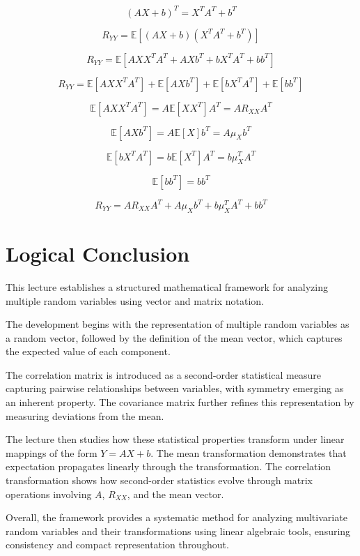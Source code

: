 \documentclass{article}
\begin{document}
\[
(A X + b)^T = X^T A^T + b^T
\]

\[
R_{YY} = \mathbb{E}[(A X + b)(X^T A^T + b^T)]
\]

\[
R_{YY} = \mathbb{E}[A X X^T A^T + A X b^T + b X^T A^T + b b^T]
\]

\[
R_{YY} = \mathbb{E}[A X X^T A^T] + \mathbb{E}[A X b^T] + \mathbb{E}[b X^T A^T] + \mathbb{E}[b b^T]
\]

\[
\mathbb{E}[A X X^T A^T] = A \mathbb{E}[X X^T] A^T = A R_{XX} A^T
\]

\[
\mathbb{E}[A X b^T] = A \mathbb{E}[X] b^T = A \mu_X b^T
\]

\[
\mathbb{E}[b X^T A^T] = b \mathbb{E}[X^T] A^T = b \mu_X^T A^T
\]

\[
\mathbb{E}[b b^T] = b b^T
\]

\[
R_{YY} = A R_{XX} A^T + A \mu_X b^T + b \mu_X^T A^T + b b^T
\]

\section{Logical Conclusion}

This lecture establishes a structured mathematical framework for analyzing multiple random variables using vector and matrix notation.

The development begins with the representation of multiple random variables as a random vector, followed by the definition of the mean vector, which captures the expected value of each component.

The correlation matrix is introduced as a second-order statistical measure capturing pairwise relationships between variables, with symmetry emerging as an inherent property. The covariance matrix further refines this representation by measuring deviations from the mean.

The lecture then studies how these statistical properties transform under linear mappings of the form $Y = A X + b$. The mean transformation demonstrates that expectation propagates linearly through the transformation. The correlation transformation shows how second-order statistics evolve through matrix operations involving $A$, $R_{XX}$, and the mean vector.

Overall, the framework provides a systematic method for analyzing multivariate random variables and their transformations using linear algebraic tools, ensuring consistency and compact representation throughout.
\end{document}

